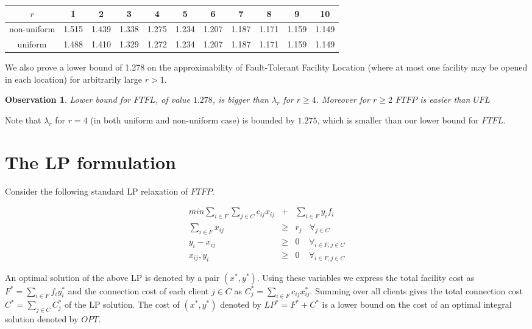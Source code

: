 \documentclass{llncs}
\newtheorem{observation}{\textbf{Observation}}
\begin{document}
\begin{center}
  \begin{tabular}{ c | c | c | c | c | c | c | c | c | c | c }
    $r$ & 1 & 2 & 3 & 4 & 5 & 6 & 7 & 8 & 9 & 10 \\ \hline
    non-uniform & 1.515 & 1.439 & 1.338 & 1.275 & 1.234 & 1.207 & 1.187 & 1.171 & 1.159 & 1.149 \\ \hline
    uniform & 1.488 & 1.410 & 1.329 & 1.272 & 1.234 & 1.207 & 1.187 & 1.171 & 1.159 & 1.149 \\
  \end{tabular}
\end{center}

We also prove a lower bound of 1.278 on the approximability of Fault-Tolerant Facility Location (where at most one facility may be opened in each location) for arbitrarily large $r > 1$. 

\begin{observation}
 Lower bound for $FTFL$, of value $1.278$, is bigger than $\lambda_r$ for $r \geq 4$. Moreover for $r \geq 2$ $FTFP$ is easier than $UFL$
\end{observation}

Note that $\lambda_r$ for $r = 4$ (in both uniform and non-uniform case) is bounded by $1.275$, which is smaller than our lower bound for $FTFL$.

\section{The LP formulation}
\label{the_lp_section}

Consider the following standard LP relaxation of $FTFP$.

\begin{eqnarray}
\label{lp_ufl:goal}
  min \sum_{i \in F}{\sum_{j \in C} {c_{ij}x_{ij}}} & + & \sum_{i \in F} y_if_i\\
 \label{lp_ufl:r_satisfy}
  \sum_{i \in F} x_{ij}&\geq& r_j ~~~~\forall_{j \in C}\\
 \label{lp_ufl:open_enough}
   y_i - x_{ij}&\geq& 0 ~~~~~\forall_{i \in F, j \in C} \\
 \label{lp_ufl:non_negative}
   x_{ij}, y_{i} &\geq& 0 ~~~~~\forall_{i \in F, j \in C}
\end{eqnarray}

An optimal solution of the above LP is denoted by a pair $(x^*, y^*)$. Using these variables we express the total facility cost as $F^* = \sum_{i \in F}f_iy_i^*$ and the connection cost of each client $j \in C$ as $C_j^* = \sum_{i \in F}c_{ij}x_{ij}^*$. Summing over all clients gives the total connection cost $C^* = \sum_{j \in C}C_j^*$ of the LP solution. The cost of $(x^*, y^*)$ denoted by $LP^* = F^* + C^*$ is a lower bound on the cost of an optimal integral solution denoted by $OPT$.
\end{document}
